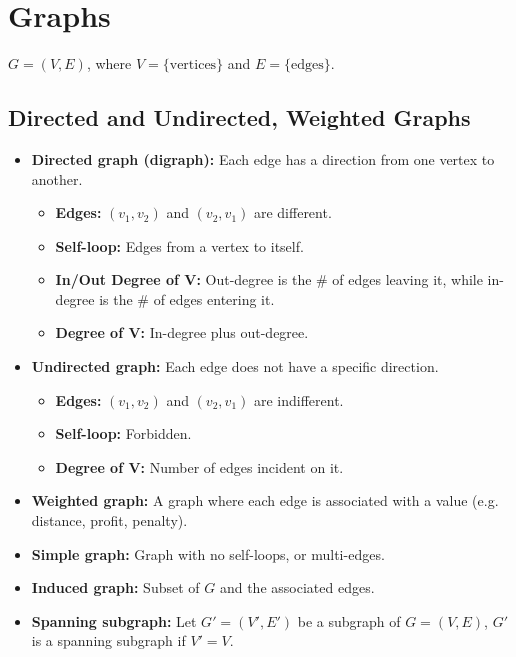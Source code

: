 \documentclass{article}
\begin{document}
\section{Graphs}
\begin{definition}
    $G = (V, E)$, where $V = \{\text{vertices}\}$ and $E = \{\text{edges}\}$.
\end{definition}

\subsection{Directed and Undirected, Weighted Graphs}
\begin{terminology}
    \begin{itemize}
        \item \textbf{Directed graph (digraph):} Each edge has a direction from one vertex to another. 
        \begin{itemize}
            \item \textbf{Edges:} $(v_1,v_2)$ and $(v_2,v_1)$ are different.
            \item \textbf{Self-loop:} Edges from a vertex to itself.
            \item \textbf{In/Out Degree of V:} Out-degree is the \# of edges leaving it, while in-degree is the \# of edges entering it.
            \item \textbf{Degree of V:} In-degree plus out-degree.
        \end{itemize}
        \item \textbf{Undirected graph:} Each edge does not have a specific direction.
        \begin{itemize}
            \item \textbf{Edges:} $(v_1,v_2)$ and $(v_2,v_1)$ are indifferent.
            \item \textbf{Self-loop:} Forbidden.
            \item \textbf{Degree of V:} Number of edges incident on it.
        \end{itemize}
        \item \textbf{Weighted graph:} A graph where each edge is associated with a value (e.g. distance, profit, penalty).
        \item \textbf{Simple graph:} Graph with no self-loops, or multi-edges.
        \item \textbf{Induced graph:} Subset of $G$ and the associated edges.
        \item \textbf{Spanning subgraph:} Let $G' = (V',E')$ be a subgraph of $G=(V,E)$, $G'$ is a spanning subgraph if $V'=V$.
    \end{itemize}
\end{terminology}
        
\end{document}
